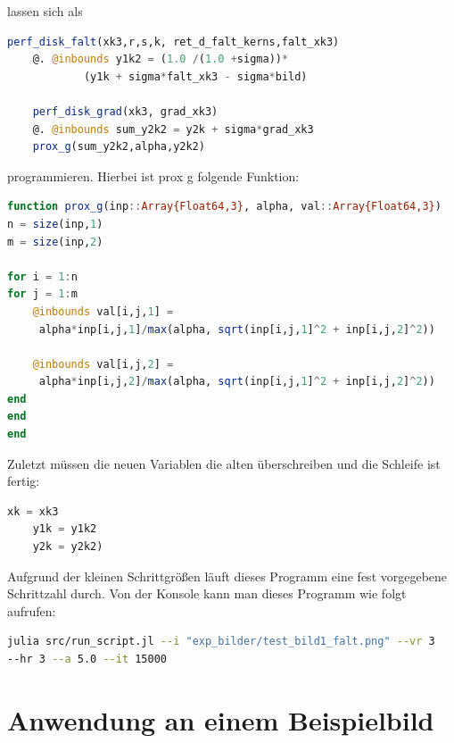 \documentclass{article}
\theoremstyle{case}
\begin{document}
lassen sich als
\begin{lstlisting}[language=Julia]
	perf_disk_falt(xk3,r,s,k, ret_d_falt_kerns,falt_xk3)
	@. @inbounds y1k2 = (1.0 /(1.0 +sigma))*
			(y1k + sigma*falt_xk3 - sigma*bild)
			
	perf_disk_grad(xk3, grad_xk3)
	@. @inbounds sum_y2k2 = y2k + sigma*grad_xk3
	prox_g(sum_y2k2,alpha,y2k2)
\end{lstlisting}
programmieren. Hierbei ist prox g folgende Funktion:
\begin{lstlisting}[language=Julia]
function prox_g(inp::Array{Float64,3}, alpha, val::Array{Float64,3})
n = size(inp,1)
m = size(inp,2)

for i = 1:n
for j = 1:m
	@inbounds val[i,j,1] =
	 alpha*inp[i,j,1]/max(alpha, sqrt(inp[i,j,1]^2 + inp[i,j,2]^2))

	@inbounds val[i,j,2] =
	 alpha*inp[i,j,2]/max(alpha, sqrt(inp[i,j,1]^2 + inp[i,j,2]^2))
end
end
end

\end{lstlisting}

Zuletzt müssen die neuen Variablen die alten überschreiben und die Schleife ist fertig:
\begin{lstlisting}[language=Julia]
	xk = xk3
	y1k = y1k2
	y2k = y2k2)
\end{lstlisting}
Aufgrund der kleinen Schrittgrößen läuft dieses Programm eine fest vorgegebene Schrittzahl durch.
\newline
Von der Konsole kann man dieses Programm wie folgt aufrufen:
\begin{lstlisting}[language=bash]
julia src/run_script.jl --i "exp_bilder/test_bild1_falt.png" --vr 3
--hr 3 --a 5.0 --it 15000
\end{lstlisting}
\newpage


\section{Anwendung an einem Beispielbild}


\end{document}

